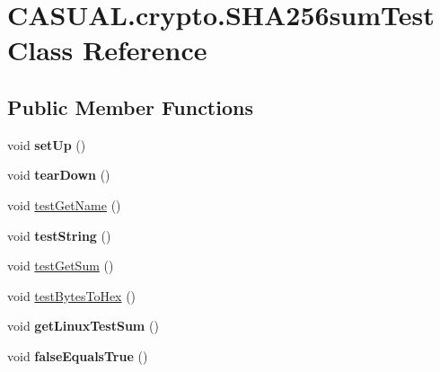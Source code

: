 \hypertarget{class_c_a_s_u_a_l_1_1crypto_1_1_s_h_a256sum_test}{\section{C\-A\-S\-U\-A\-L.\-crypto.\-S\-H\-A256sum\-Test Class Reference}
\label{class_c_a_s_u_a_l_1_1crypto_1_1_s_h_a256sum_test}
}
\subsection*{Public Member Functions}
\begin{DoxyCompactItemize}
\item 
\hypertarget{class_c_a_s_u_a_l_1_1crypto_1_1_s_h_a256sum_test_a47ee188a29eff12683da6c241a2cc5d0}{void {\bfseries set\-Up} ()}\label{class_c_a_s_u_a_l_1_1crypto_1_1_s_h_a256sum_test_a47ee188a29eff12683da6c241a2cc5d0}

\item 
\hypertarget{class_c_a_s_u_a_l_1_1crypto_1_1_s_h_a256sum_test_a133bfddcf23c02f7682b54c159766c7d}{void {\bfseries tear\-Down} ()}\label{class_c_a_s_u_a_l_1_1crypto_1_1_s_h_a256sum_test_a133bfddcf23c02f7682b54c159766c7d}

\item 
void \hyperlink{class_c_a_s_u_a_l_1_1crypto_1_1_s_h_a256sum_test_aa32bc5a04f72608f889b6fa3d9137864}{test\-Get\-Name} ()
\item 
\hypertarget{class_c_a_s_u_a_l_1_1crypto_1_1_s_h_a256sum_test_a6d7d1acf6c4e51509ae4ae44a7f413e2}{void {\bfseries test\-String} ()}\label{class_c_a_s_u_a_l_1_1crypto_1_1_s_h_a256sum_test_a6d7d1acf6c4e51509ae4ae44a7f413e2}

\item 
void \hyperlink{class_c_a_s_u_a_l_1_1crypto_1_1_s_h_a256sum_test_aa64bfb4fd5c838fb57fa854ae88e616c}{test\-Get\-Sum} ()
\item 
void \hyperlink{class_c_a_s_u_a_l_1_1crypto_1_1_s_h_a256sum_test_a312c80659b205ac950704ea54c51d648}{test\-Bytes\-To\-Hex} ()
\item 
\hypertarget{class_c_a_s_u_a_l_1_1crypto_1_1_s_h_a256sum_test_ad48c86e6a4af45643ffe4059b2e69127}{void {\bfseries get\-Linux\-Test\-Sum} ()}\label{class_c_a_s_u_a_l_1_1crypto_1_1_s_h_a256sum_test_ad48c86e6a4af45643ffe4059b2e69127}

\item 
\hypertarget{class_c_a_s_u_a_l_1_1crypto_1_1_s_h_a256sum_test_a892d1f9d57ea82598025227cfa9f9364}{void {\bfseries false\-Equals\-True} ()}\label{class_c_a_s_u_a_l_1_1crypto_1_1_s_h_a256sum_test_a892d1f9d57ea82598025227cfa9f9364}


\end{DoxyCompactItemize}
